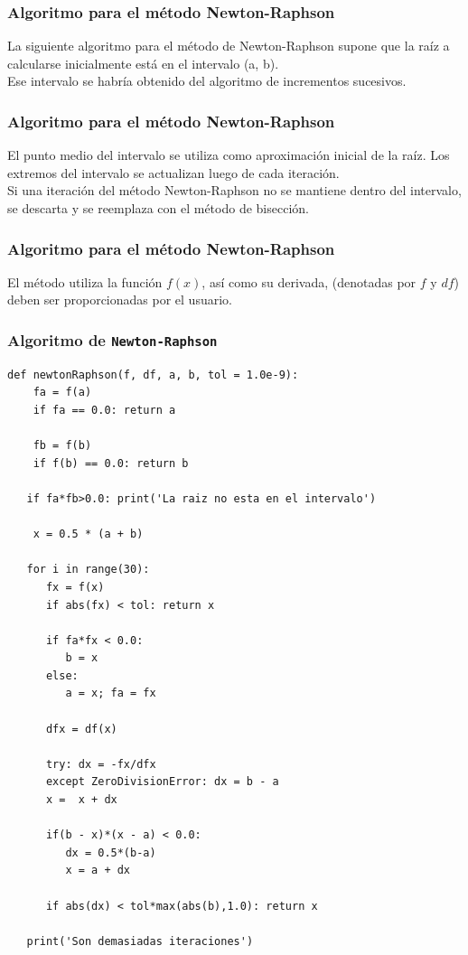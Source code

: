 \begin{frame}
\frametitle{Algoritmo para el método Newton-Raphson}
La siguiente algoritmo para el método de Newton-Raphson supone que la raíz a calcularse inicialmente está en el intervalo (a, b).
\\
\bigskip
Ese intervalo se habría obtenido del algoritmo de incrementos sucesivos.
\end{frame}
\begin{frame}
\frametitle{Algoritmo para el método Newton-Raphson}
El punto medio del intervalo se utiliza como aproximación inicial de la raíz. Los extremos del intervalo se actualizan luego de cada iteración.
\\
\bigskip
Si una iteración del método Newton-Raphson no se mantiene dentro del intervalo, se descarta y se reemplaza con el método de bisección.
\end{frame}
\begin{frame}
\frametitle{Algoritmo para el método Newton-Raphson}
El método  utiliza la función $f(x)$, así como su derivada, (denotadas por $f$ y $df$) deben ser proporcionadas por el usuario.
\end{frame}
\begin{frame}
\frametitle{Algoritmo de \texttt{Newton-Raphson}}
\begin{lstlisting}[caption=Código del método N-R, style=codigopython]
def newtonRaphson(f, df, a, b, tol = 1.0e-9):
    fa = f(a)
	if fa == 0.0: return a

    fb = f(b)
    if f(b) == 0.0: return b

   if fa*fb>0.0: print('La raiz no esta en el intervalo')

	x = 0.5 * (a + b)

   for i in range(30):
      fx = f(x)
      if abs(fx) < tol: return x

      if fa*fx < 0.0:
         b = x
      else:
         a = x; fa = fx

      dfx = df(x)
        
      try: dx = -fx/dfx
      except ZeroDivisionError: dx = b - a
      x =  x + dx
  
      if(b - x)*(x - a) < 0.0:
         dx = 0.5*(b-a)
         x = a + dx
        
      if abs(dx) < tol*max(abs(b),1.0): return x
    
   print('Son demasiadas iteraciones')
\end{lstlisting}
\end{frame}
